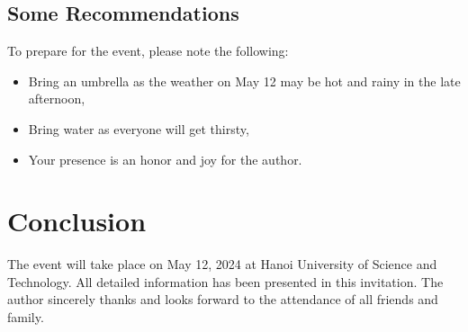 \documentclass[final,5p,times,twocolumn, 8pt, a4paper]{elsarticle}
\begin{document}
        \subsection{Some Recommendations}
            \par To prepare for the event, please note the following:
            \begin{itemize}
                \item Bring an umbrella as the weather on May 12 may be hot and rainy in the late afternoon,
                \item Bring water as everyone will get thirsty,
                \item Your presence is an honor and joy for the author.
            \end{itemize}

    \section{Conclusion}
        \par The event will take place on May 12, 2024 at Hanoi University of Science and Technology. All detailed information has been presented in this invitation. The author sincerely thanks and looks forward to the attendance of all friends and family.

        
\end{document}

